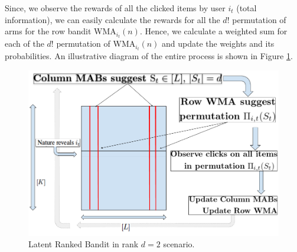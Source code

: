 Since, we observe the rewards of all the clicked items by user $i_t$ (total information), we can easily calculate the rewards for all the $d!$ permutation of arms for the row bandit WMA$_{i_t}(n)$. Hence, we calculate a weighted sum for each of the $d!$ permutation of WMA$_{i_t}(n)$ and update the weights and its probabilities. An illustrative diagram of the entire process is shown in Figure \ref{fig:rankedbandit}.


\begin{figure}[!th]
    \includegraphics[scale=0.2]{img/RankedBand.png}
    \caption{Latent Ranked Bandit in rank $d=2$ scenario.}
    \label{fig:rankedbandit}
    \vspace*{-1em}
\end{figure}

